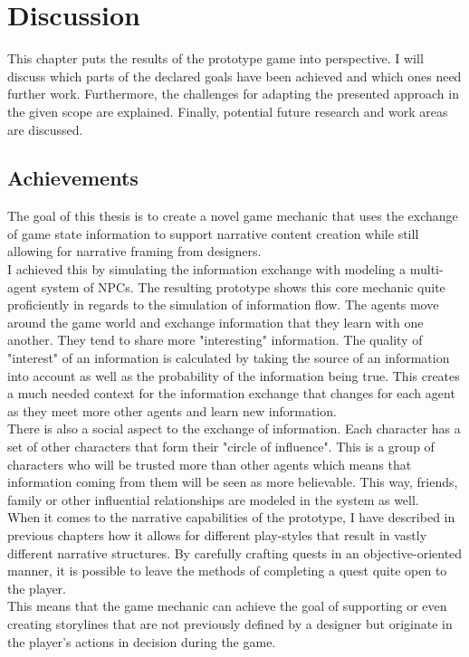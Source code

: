 \chapter{Discussion} %
This chapter puts the results of the prototype game into perspective. I will discuss which parts of the declared goals have been achieved and which ones need further work. Furthermore, the challenges for adapting the presented approach in the given scope are explained. Finally, potential future research and work areas are discussed.
\section{Achievements}
The goal of this thesis is to create a novel game mechanic that uses the exchange of game state information to support narrative content creation while still allowing for narrative framing from designers.\\
I achieved this by simulating the information exchange with modeling a multi-agent system of NPCs. The resulting prototype shows this core mechanic quite proficiently in regards to the simulation of information flow. The agents move around the game world and exchange information that they learn with one another. They tend to share more "interesting" information. The quality of "interest" of an information is calculated by taking the source of an information into account as well as the probability of the information being true. This creates a much needed context for the information exchange that changes for each agent as they meet more other agents and learn new information.\\
There is also a social aspect to the exchange of information. Each character has a set of other characters that form their "circle of influence". This is a group of characters who will be trusted more than other agents which means that information coming from them will be seen as more believable. This way, friends, family or other influential relationships are modeled in the system as well.\\
When it comes to the narrative capabilities of the prototype, I have described in previous chapters how it allows for different play-styles that result in vastly different narrative structures. By carefully crafting quests in an objective-oriented manner, it is possible to leave the methods of completing a quest quite open to the player.\\
This means that the game mechanic can achieve the goal of supporting or even creating storylines that are not previously defined by a designer but originate in the player's actions in decision during the game.\\
